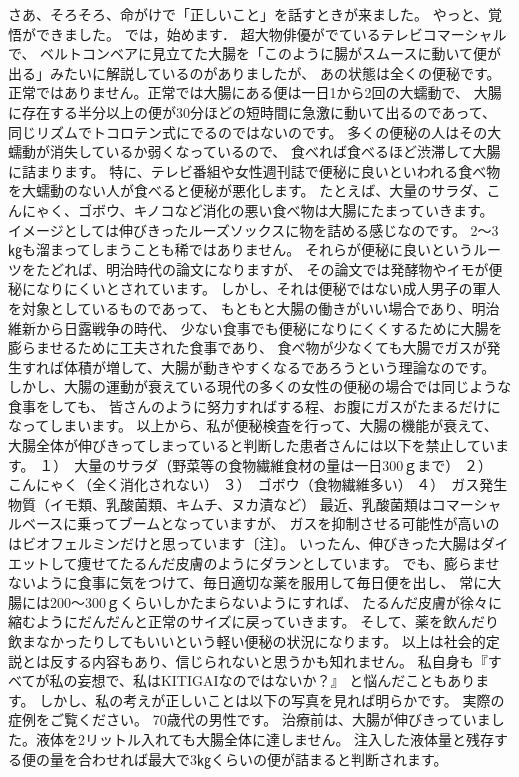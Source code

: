 さあ、そろそろ、命がけで「正しいこと」を話すときが来ました。
やっと、覚悟ができました。
では，始めます．
超大物俳優がでているテレビコマーシャルで、
ベルトコンベアに見立てた大腸を「このように腸がスムースに動いて便が出る」みたいに解説しているのがありましたが、
あの状態は全くの便秘です。
正常ではありません。正常では大腸にある便は一日1から2回の大蠕動で、
大腸に存在する半分以上の便が30分ほどの短時間に急激に動いて出るのであって、
同じリズムでトコロテン式にでるのではないのです。
多くの便秘の人はその大蠕動が消失しているか弱くなっているので、
食べれば食べるほど渋滞して大腸に詰まります。
特に、テレビ番組や女性週刊誌で便秘に良いといわれる食べ物を大蠕動のない人が食べると便秘が悪化します。
たとえば、大量のサラダ、こんにゃく、ゴボウ、キノコなど消化の悪い食べ物は大腸にたまっていきます。
イメージとしては伸びきったルーズソックスに物を詰める感じなのです。
2～3㎏も溜まってしまうことも稀ではありません。
それらが便秘に良いというルーツをたどれば、明治時代の論文になりますが、
その論文では発酵物やイモが便秘になりにくいとされています。
しかし、それは便秘ではない成人男子の軍人を対象としているものであって、
もともと大腸の働きがいい場合であり、明治維新から日露戦争の時代、
少ない食事でも便秘になりにくくするために大腸を膨らませるために工夫された食事であり、
食べ物が少なくても大腸でガスが発生すれば体積が増して、大腸が動きやすくなるであろうという理論なのです。
しかし、大腸の運動が衰えている現代の多くの女性の便秘の場合では同じような食事をしても、
皆さんのように努力すればする程、お腹にガスがたまるだけになってしまいます。
以上から、私が便秘検査を行って、大腸の機能が衰えて、
大腸全体が伸びきってしまっていると判断した患者さんには以下を禁止しています。
１）　大量のサラダ（野菜等の食物繊維食材の量は一日300ｇまで）
２）　こんにゃく（全く消化されない）
３）　ゴボウ（食物繊維多い）
４）　ガス発生物質（イモ類、乳酸菌類、キムチ、ヌカ漬など）
最近、乳酸菌類はコマーシャルベースに乗ってブームとなっていますが、
ガスを抑制させる可能性が高いのはビオフェルミンだけと思っています〔注〕。
いったん、伸びきった大腸はダイエットして痩せてたるんだ皮膚のようにダランとしています。
でも、膨らませないように食事に気をつけて、毎日適切な薬を服用して毎日便を出し、
常に大腸には200～300ｇくらいしかたまらないようにすれば、
たるんだ皮膚が徐々に縮むようにだんだんと正常のサイズに戻っていきます。
そして、薬を飲んだり飲まなかったりしてもいいという軽い便秘の状況になります。
以上は社会的定説とは反する内容もあり、信じられないと思うかも知れません。
私自身も『すべてが私の妄想で、私はKITIGAIなのではないか？』
と悩んだこともあります。
しかし、私の考えが正しいことは以下の写真を見れば明らかです。
実際の症例をご覧ください。
70歳代の男性です。
治療前は、大腸が伸びきっていました。液体を2リットル入れても大腸全体に達しません。
注入した液体量と残存する便の量を合わせれば最大で3㎏くらいの便が詰まると判断されます。

